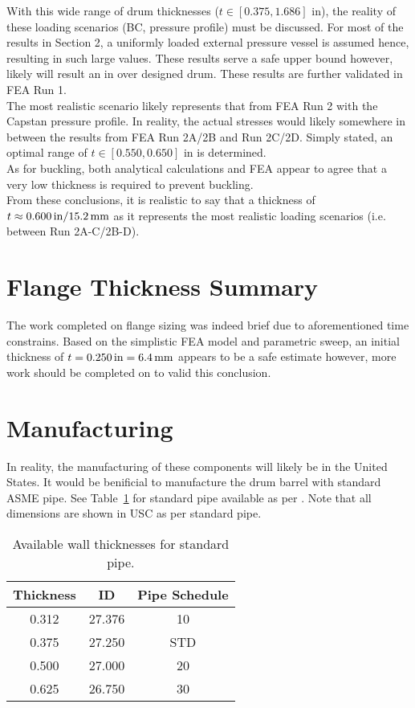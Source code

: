 With this wide range of drum thicknesses ($t\in[0.375,1.686]$ in), the reality of these loading scenarios (BC, pressure profile) must be discussed. For most of the results in Section 2, a uniformly loaded external pressure vessel is assumed hence, resulting in such large values. These results serve a safe upper bound however, likely will result an in over designed drum. These results are further validated in FEA Run 1.\\

The most realistic scenario likely represents that from FEA Run 2 with the Capstan pressure profile. In reality, the actual stresses would likely somewhere in between the results from FEA Run 2A/2B and Run 2C/2D. Simply stated, an optimal range of $t\in[0.550,0.650]$ in is determined.\\

As for buckling, both analytical calculations and FEA appear to agree that a very low thickness is required to prevent buckling. \\

From these conclusions, it is realistic to say that a thickness of $t \approx 0.600\,\mathrm{in} /\/ 15.2\,\mathrm{mm}$ as it represents the most realistic loading scenarios (i.e. between Run 2A-C/2B-D). 

\section{Flange Thickness Summary}

The work completed on flange sizing was indeed brief due to aforementioned time constrains. Based on the simplistic FEA model and parametric sweep, an initial thickness of $t=0.250\,\mathrm{in}=6.4\,\mathrm{mm}$ appears to be a safe estimate however, more work should be completed on to valid this conclusion.

\section{Manufacturing}

In reality, the manufacturing of these components will likely be in the United States. It would be benificial to manufacture the drum barrel with standard ASME pipe. See Table~\ref{table:5_pipe} for standard pipe available as per \cite{PIPEINFO}. Note that all dimensions are shown in USC as per standard pipe.

\begin{table}[H]
	\caption[Available wall thicknesses for standard pipe.]{Available wall thicknesses for standard pipe.\protect\cite{PIPEINFO}}
	\centering
	\begin{tabular}{ccc}
    \textbf{Thickness} & \textbf{ID} & \textbf{Pipe Schedule} \\
    \midrule
    0.312 & 27.376 & 10 \\
    0.375 & 27.250 & STD \\
    0.500 & 27.000 & 20 \\
    0.625 & 26.750 & 30 \\
    \end{tabular}%
	\label{table:5_pipe}
\end{table}

